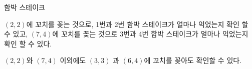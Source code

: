 \begin{problem}{함박 스테이크}
\Examples

\begin{example}
\end{example}

$(2, 2)$에 꼬치를 꽂는 것으로, 1번과 2번 함박 스테이크가 얼마나 익었는지 확인 할 수 있고, $(7, 4)$에 꼬치를 꽂는 것으로 3번과 4번 함박 스테이크가 얼마나 익었는지 확인 할 수 있다.

$(2, 2)$와 $(7, 4)$ 이외에도 $(3, 3)$ 과 $(6, 4)$에 꼬치를 꽂아도 확인할 수 있다.

\begin{example}
\end{example}

\end{problem}

